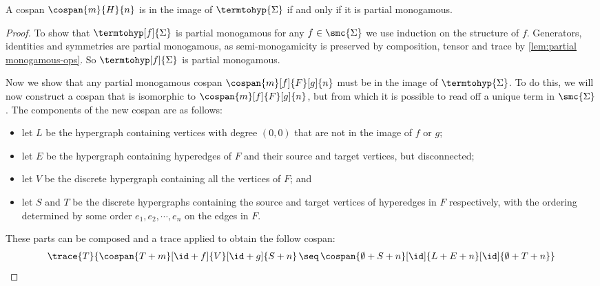 \begin{proposition}\label{prop:termtohyp-image}
    A cospan \(\cospan{m}{H}{n}\) is in the image of \(\termtohyp{\Sigma}\) if and only if it is partial monogamous.
\end{proposition}
\begin{proof}
    To show that \(\termtohyp[f]{\Sigma}\) is partial monogamous for any \(f \in \smc{\Sigma}\) we use induction on the structure of \(f\).
    Generators, identities and symmetries are partial monogamous, as semi-monogamicity is preserved by composition, tensor and trace by \cref{lem:partial monogamous-ops}.
    So \(\termtohyp[f]{\Sigma}\) is partial monogamous.

    Now we show that any partial monogamous cospan \(\cospan{m}[f]{F}[g]{n}\) must be in the image of \(\termtohyp{\Sigma}\).
    To do this, we will now construct a cospan that is isomorphic to \(\cospan{m}[f]{F}[g]{n}\), but from which it is possible to read off a unique term in \(\smc{\Sigma}\).
    The components of the new cospan are as follows:
    \begin{itemize}
        \item let \(L\) be the hypergraph containing vertices with degree \((0,0)\) that are not in the image of \(f\) or \(g\);
        \item let \(E\) be the hypergraph containing hyperedges of \(F\) and their source and target vertices, but disconnected;
        \item let \(V\) be the discrete hypergraph containing all the vertices of \(F\); and
        \item let \(S\) and \(T\) be the discrete hypergraphs containing the source and target vertices of hyperedges in \(F\) respectively, with the ordering determined by some order \(e_1,e_2,\cdots,e_n\) on the edges in \(F\).
    \end{itemize}

    \noindent
    These parts can be composed and a trace applied to obtain the follow cospan:
    \begin{gather}
        \trace{T}{\cospan{T + m}[\id + f]{V}[\id + g]{S + n} \,\seq\, \cospan{\emptyset + S + n}[\id]{L + E + n}[\id]{\emptyset + T + n}}\label{gat:cospan}
    \end{gather}


\end{proof}
